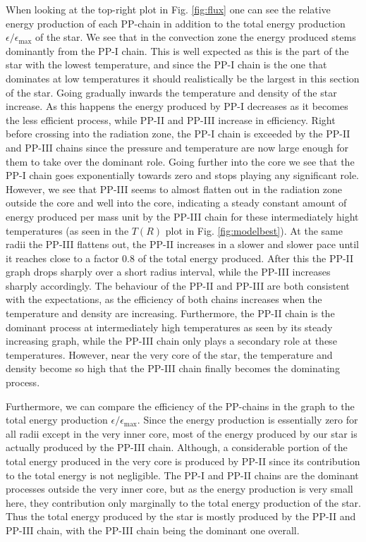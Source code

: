 \documentclass{emulateapj}
\begin{document}
	When looking at the top-right plot in Fig. \ref{fig:flux} one can see the relative energy production of each PP-chain in addition to the total energy production $\epsilon/\epsilon_\text{max}$ of the star. We see that in the convection zone the energy produced stems dominantly from the PP-I chain. This is well expected as this is the part of the star with the lowest temperature, and since the PP-I chain is the one that dominates at low temperatures it should realistically be the largest in this section of the star. Going gradually inwards the temperature and density of the star increase. As this happens the energy produced by PP-I decreases as it becomes the less efficient process, while PP-II and PP-III increase in efficiency. Right before crossing into the radiation zone, the PP-I chain is exceeded by the PP-II and PP-III chains since the pressure and temperature are now large enough for them to take over the dominant role. Going further into the core we see that the PP-I chain goes exponentially towards zero and stops playing any significant role. However, we see that PP-III seems to almost flatten out in the radiation zone outside the core and well into the core, indicating a steady constant amount of energy produced per mass unit by the PP-III chain for these intermediately hight temperatures (as seen in the $T(R)$ plot in Fig. \ref{fig:modelbest}). At the same radii the PP-III flattens out, the PP-II increases in a slower and slower pace until it reaches close to a factor 0.8 of the total energy produced. After this the PP-II graph drops sharply over a short radius interval, while the PP-III increases sharply accordingly. The behaviour of the PP-II and PP-III are both consistent with the expectations, as the efficiency of both chains increases when the temperature and density are increasing. Furthermore, the PP-II chain is the dominant process at intermediately high temperatures as seen by its steady increasing graph, while the PP-III chain only plays a secondary role at these temperatures. However, near the very core of the star, the temperature and density become so high that the PP-III chain finally becomes the dominating process.
	
	Furthermore, we can compare the efficiency of the PP-chains in the graph to the total energy production $\epsilon/\epsilon_\text{max}$. Since the energy production is essentially zero for all radii except in the very inner core, most of the energy produced by our star is actually produced by the PP-III chain. Although, a considerable portion of the total energy produced in the very core is produced by PP-II since its contribution to the total energy is not negligible. The PP-I and PP-II chains are the dominant processes outside the very inner core, but as the energy production is very small here, they contribution only marginally to the total energy production of the star. Thus the total energy produced by the star is mostly produced by the PP-II and PP-III chain, with the PP-III chain being the dominant one overall.
	
\end{document}
